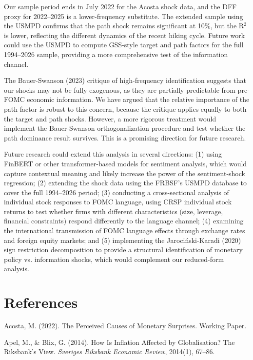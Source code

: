 \documentclass[12pt]{article}
\begin{document}
Our sample period ends in July 2022 for the Acosta shock data, and the DFF proxy for 2022–2025 is a lower-frequency substitute. The extended sample using the USMPD confirms that the path shock remains significant at 10\%, but the R$^2$ is lower, reflecting the different dynamics of the recent hiking cycle. Future work could use the USMPD to compute GSS-style target and path factors for the full 1994–2026 sample, providing a more comprehensive test of the information channel.

The Bauer-Swanson (2023) critique of high-frequency identification suggests that our shocks may not be fully exogenous, as they are partially predictable from pre-FOMC economic information. We have argued that the relative importance of the path factor is robust to this concern, because the critique applies equally to both the target and path shocks. However, a more rigorous treatment would implement the Bauer-Swanson orthogonalization procedure and test whether the path dominance result survives. This is a promising direction for future research.

Future research could extend this analysis in several directions: (1) using FinBERT or other transformer-based models for sentiment analysis, which would capture contextual meaning and likely increase the power of the sentiment-shock regression; (2) extending the shock data using the FRBSF's USMPD database to cover the full 1994–2026 period; (3) conducting a cross-sectional analysis of individual stock responses to FOMC language, using CRSP individual stock returns to test whether firms with different characteristics (size, leverage, financial constraints) respond differently to the language channel; (4) examining the international transmission of FOMC language effects through exchange rates and foreign equity markets; and (5) implementing the Jarociński-Karadi (2020) sign restriction decomposition to provide a structural identification of monetary policy vs. information shocks, which would complement our reduced-form analysis.


\section{References}

Acosta, M. (2022). The Perceived Causes of Monetary Surprises. Working Paper.

Apel, M., & Blix, G. (2014). How Is Inflation Affected by Globalisation? The Riksbank's View. \textit{Sveriges Riksbank Economic Review}, 2014(1), 67–86.
\end{document}
